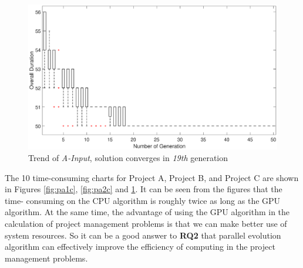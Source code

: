 \begin{figure}[!htb]
  \centering
  \includegraphics[width=\textwidth]{figures/fig_pa1.eps}
  \caption{Trend of \emph{A-Input}, solution converges in \emph{19th} generation}
  \label{fig:pa3c}
\end{figure}

The 10 time-consuming charts for Project A, Project B, and Project C are shown
in Figures \ref{fig:pa1c}, \ref{fig:pa2c} and \ref{fig:pa3c}. It can be seen
from the figures that the time- consuming on the CPU algorithm is roughly twice
as long as the GPU algorithm.  At the same time, the advantage of using the GPU
algorithm in the calculation of project management problems is that we can make
better use of system resources. So it can be a good answer to \textbf{RQ2} that
parallel evolution algorithm can effectively improve the efficiency of computing
in the project management problems.

